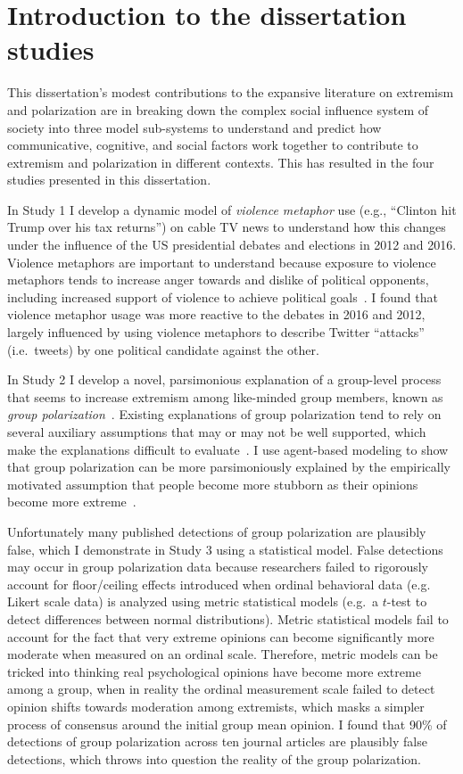 \documentclass[12pt,letterpaper]{article}
\begin{document}
\section{Introduction to the dissertation studies}

This dissertation's modest contributions to the expansive literature on extremism
and polarization are in breaking down the complex social influence system of
society into three model sub-systems to understand and predict how communicative,
cognitive, and social factors work together to contribute to extremism and polarization
in different contexts. This has resulted in the four studies presented in this dissertation.

In Study 1 I develop a dynamic model of \emph{violence metaphor} use (e.g.,
``Clinton hit Trump over his tax returns'') on cable TV news to understand how
this changes under the influence of the US presidential debates and elections
in 2012 and 2016. Violence metaphors are important to understand because 
exposure to violence metaphors tends to increase anger towards and dislike of 
political opponents, including increased support of violence to achieve
political goals~\cite{Kalmoe2014,Kalmoe2018}.
I found that violence metaphor usage was more reactive to
the debates in 2016 and 2012, largely influenced by using violence metaphors
to describe Twitter ``attacks'' (i.e.\ tweets) by one political candidate
against the other. 

In Study 2 I develop a novel, parsimonious explanation of a group-level process that seems
to increase extremism among like-minded group members, known as
\emph{group polarization}~\cite{Brown1986,Isenberg1986,Brown2000,Sunstein2002}.
Existing explanations of group polarization tend to rely on several auxiliary
assumptions that may or may not be well supported, which make the explanations
difficult to evaluate~\cite{Meehl1990}. I use agent-based modeling to
show that group polarization can
be more parsimoniously explained by the empirically motivated assumption 
that people become more stubborn as their opinions become more 
extreme~\cite{Reiss2019,Zmigrod2019a,Kinder2017}. 

Unfortunately many published detections
of group polarization are plausibly false, which I demonstrate in
Study 3 using a statistical model. False detections may occur in group polarization
data because researchers failed to rigorously account for floor/ceiling effects
introduced when ordinal behavioral data (e.g. Likert scale data) is analyzed
using metric statistical models (e.g.\ a $t$-test to detect differences between
normal distributions). Metric statistical models fail to account for
the fact that very extreme opinions can become significantly more moderate
when measured on an ordinal scale. Therefore, metric models can be tricked into
thinking real psychological opinions have become more extreme among a group,
when in reality the ordinal measurement scale failed to detect opinion shifts
towards moderation among extremists, 
which masks a simpler process of consensus around the initial group mean opinion.
I found that 90\% of detections of group polarization across ten journal articles
are plausibly false detections, which throws into question the reality of
the group polarization.
\end{document}
